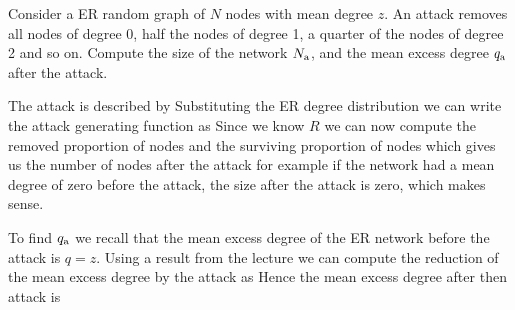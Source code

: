 
\label{exAttackAbsTarg}Consider a ER random graph of $N$ nodes with mean degree $z$. An attack removes all nodes of degree 0, half the nodes of degree 1, a quarter of the nodes of degree 2 and so on. Compute the size of the network $N_{\rm a}$, and the mean excess degree $q_{\rm a}$ after the attack. 

\solution 
The attack is described by 
Substituting the ER degree distribution 
we can write the attack generating function as 
Since we know $R$ we can now compute the removed proportion of nodes 
and the surviving proportion of nodes 
which gives us the number of nodes after the attack
for example if the network had a mean degree of zero before the attack, the size after the attack is zero, which makes sense. 

To find $q_{\rm a}$ we recall that the mean excess degree of the ER network before the attack is $q=z$. Using a result from the lecture we can compute the reduction of the mean excess degree by the attack as 
Hence the mean excess degree after then attack is 
